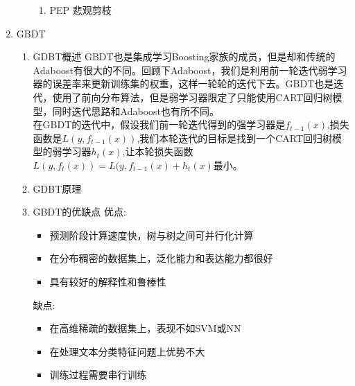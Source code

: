 \begin{enumerate}
\begin{enumerate}
\begin{enumerate}
			\item PEP 悲观剪枝
		\end{enumerate}
	\end{enumerate}
	\item GBDT
	\begin{enumerate}
		\item GDBT概述
		GBDT也是集成学习Boosting家族的成员，但是却和传统的Adaboost有很大的不同。回顾下Adaboost，我们是利用前一轮迭代弱学习器的误差率来更新训练集的权重，这样一轮轮的迭代下去。GBDT也是迭代，使用了前向分布算法，但是弱学习器限定了只能使用CART回归树模型，同时迭代思路和Adaboost也有所不同。\\
		在GBDT的迭代中，假设我们前一轮迭代得到的强学习器是$f_{t-1}(x)$,损失函数是$L(y,f_{t-1}(x))$,我们本轮迭代的目标是找到一个CART回归树模型的弱学习器$h_{t}(x)$,让本轮损失函数$L(y,f_{t}(x))=L(y,f_{t-1}(x)+h_{t}(x)$最小。
		\item GDBT原理
		
		\item GBDT的优缺点
		优点:\\
		\begin{itemize}
			\item 预测阶段计算速度快，树与树之间可并行化计算
			\item 在分布稠密的数据集上，泛化能力和表达能力都很好
			\item 具有较好的解释性和鲁棒性
		\end{itemize}
		缺点:\\
		\begin{itemize}
			\item 在高维稀疏的数据集上，表现不如SVM或NN
			\item 在处理文本分类特征问题上优势不大
			\item 训练过程需要串行训练
		\end{itemize}
	\end{enumerate}
\end{enumerate}